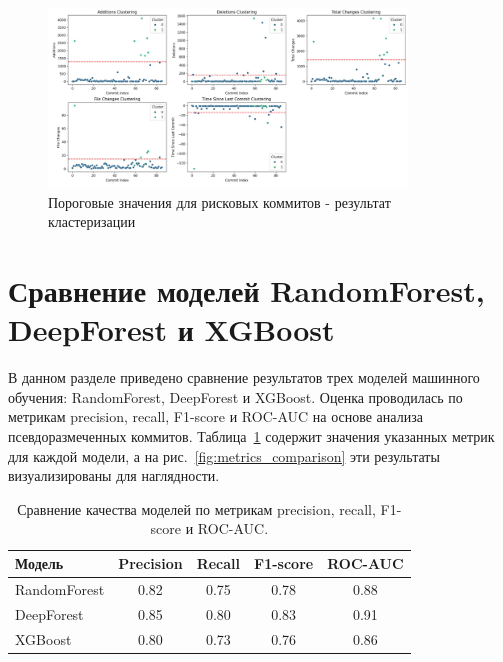 \begin{figure}[ht]
	\centering
	\includegraphics[width=0.85\textwidth]{my_folder/images/clustering.png}
	\caption{Пороговые значения для рисковых коммитов - результат кластеризации}
\end{figure}

\section{Сравнение моделей RandomForest, DeepForest и XGBoost}

В данном разделе приведено сравнение результатов трех моделей машинного обучения: RandomForest, DeepForest и XGBoost. Оценка проводилась по метрикам precision, recall, F1-score и ROC-AUC на основе анализа псевдоразмеченных коммитов. Таблица~\ref{tab:metrics_comparison} содержит значения указанных метрик для каждой модели, а на рис.~\ref{fig:metrics_comparison} эти результаты визуализированы для наглядности.

\begin{table}[h!]
	\centering
	\begin{tabular}{lcccc}
		\hline
		Модель & Precision & Recall & F1-score & ROC-AUC \\
		\hline
		RandomForest & 0.82 & 0.75 & 0.78 & 0.88 \\
		DeepForest   & 0.85 & 0.80 & 0.83 & 0.91 \\
		XGBoost      & 0.80 & 0.73 & 0.76 & 0.86 \\
		\hline
	\end{tabular}
	\caption{Сравнение качества моделей по метрикам precision, recall, F1-score и ROC-AUC.}
	\label{tab:metrics_comparison}
\end{table}

